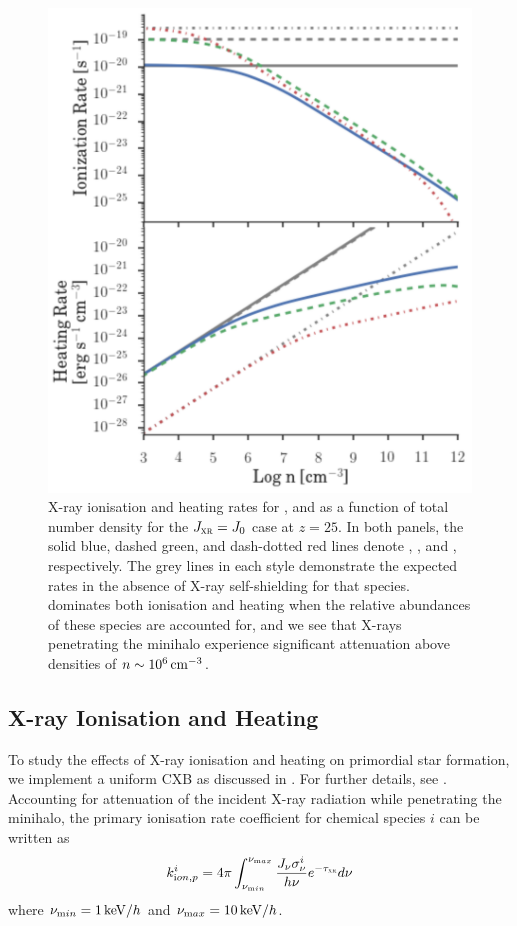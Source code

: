 \documentclass[../thesis.tex]{subfiles}
\begin{document}
\begin{figure}
\begin{center}
\includegraphics[width=\columnwidth]{figures/khrates/khratesXR}
\caption{\label{fig:khratesXR}
X-ray ionisation and heating rates for \HI, \HeI and \HeII as a function of total number density for the $J_{\textsc{xr}}=J_0$ case at $z=25$. In both panels, the solid blue, dashed green, and dash-dotted red lines denote \HI, \HeI, and \HeII, respectively.  The grey lines in each style demonstrate the expected rates in the absence of X-ray self-shielding for that species.  \HI dominates both ionisation and heating when the relative abundances of these species are accounted for, and we see that X-rays penetrating the minihalo experience significant attenuation above densities of $n\sim10^6\,\mathrm{cm}^{-3}$.}
\end{center}
\end{figure}

\subsection{X-ray Ionisation and Heating}
\label{xrays}
To study the effects of X-ray ionisation and heating on primordial star formation, we implement a uniform CXB as discussed in . For further details, see \citet{Jeonetal2012, Jeonetal2014a}. Accounting for attenuation of the incident X-ray radiation while penetrating the minihalo, the primary ionisation rate coefficient for chemical species $i$ can be written as 
\begin{equation}
k^i_{\mathrm ion, p} = 4\pi \int_{\nu_{\mathrm min}}^{\nu_{\mathrm max}}
\frac{J_{\nu} \sigma^i_{\nu}}{h \nu} e^{-\tau_{\textsc{xr}}} d\nu
\end{equation}
where $\nu_{\mathrm min} = 1\,\mathrm{keV}/h$ and $\nu_{\mathrm max} = 10\,\mathrm{keV}/h$.  
\end{document}
